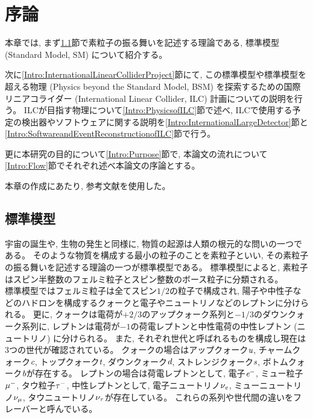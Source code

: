 
\chapter{序論} \label{chap:Introduction}

本章では, まず\ref{Intro:StandardModel}節で素粒子の振る舞いを記述する理論である, 標準模型 (Standard Model, SM) について紹介する。

次に\ref{Intro:InternationalLinearColliderProject}節にて, この標準模型や標準模型を超える物理 (Physics beyond the Standard Model, BSM) を探索するための国際リニアコライダー (International Linear Collider, ILC) 計画についての説明を行う。
ILCが目指す物理について\ref{Intro:PhysicsofILC}節で述べ, ILCで使用する予定の検出器やソフトウェアに関する説明を\ref{Intro:InternationalLargeDetector}節と\ref{Intro:SoftwareandEventReconstructionofILC}節で行う。

更に本研究の目的について\ref{Intro:Purpose}節で, 本論文の流れについて\ref{Intro:Flow}節でそれぞれ述べ本論文の序論とする。

本章の作成にあたり, 参考文献\cite{GlobalProject, InterimDesignReport}を使用した。


\section{標準模型} \label{Intro:StandardModel}

宇宙の誕生や, 生物の発生と同様に, 物質の起源は人類の根元的な問いの一つである。
そのような物質を構成する最小の粒子のことを素粒子といい, その素粒子の振る舞いを記述する理論の一つが標準模型である。
標準模型によると, 素粒子はスピン半整数のフェルミ粒子とスピン整数のボース粒子に分類される。\\

標準模型ではフェルミ粒子は全てスピン$1/2$の粒子で構成され, 陽子や中性子などのハドロンを構成するクォークと電子やニュートリノなどのレプトンに分けられる。
更に, クォークは電荷が$+2/3$のアップクォーク系列と$-1/3$のダウンクォーク系列に, レプトンは電荷が$-1$の荷電レプトンと中性電荷の中性レプトン (ニュートリノ) に分けられる。
また, それぞれ世代と呼ばれるものを構成し現在は3つの世代が確認されている。
クォークの場合はアップクォーク$\textit u$, チャームクォーク$\textit c$, トップクォーク$\textit t$, ダウンクォーク$\textit d$, ストレンジクォーク$\textit s$, ボトムクォーク$\textit b$が存在する。
レプトンの場合は荷電レプトンとして, 電子$\textit e^-$, ミュー粒子$\it \mu^-$, タウ粒子$\it \tau^-$, 中性レプトンとして, 電子ニュートリノ$\it \nu_e$, ミューニュートリノ$\it \nu_{\mu}$, タウニュートリノ$\it \nu_{\tau}$が存在している。
これらの系列や世代間の違いをフレーバーと呼んでいる。

